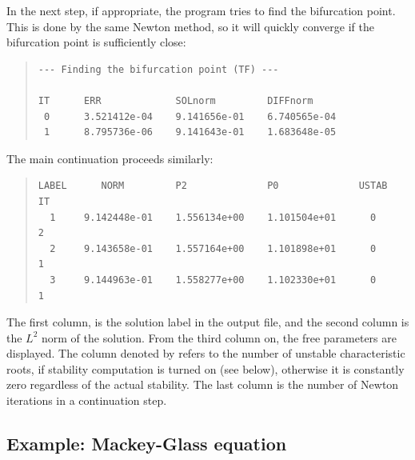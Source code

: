 \documentclass[10pt,a4paper]{ddedoc}
\begin{document}
In the next step, if appropriate, the program tries to find the bifurcation
point. This is done by the same Newton method, so it will quickly converge if
the bifurcation point is sufficiently close:
{ \small \begin{quote} \begin{lstlisting}[basicstyle=\tt,frame=single]
--- Finding the bifurcation point (TF) ---

IT      ERR             SOLnorm         DIFFnorm
 0      3.521412e-04    9.141656e-01    6.740565e-04
 1      8.795736e-06    9.141643e-01    1.683648e-05
\end{lstlisting} \end{quote} } \noindent

The main continuation proceeds similarly:
{ \small \begin{quote} \begin{lstlisting}[basicstyle=\tt,frame=single]
LABEL      NORM         P2              P0              USTAB   IT
  1     9.142448e-01    1.556134e+00    1.101504e+01      0     2
  2     9.143658e-01    1.557164e+00    1.101898e+01      0     1
  3     9.144963e-01    1.558277e+00    1.102330e+01      0     1
\end{lstlisting} \end{quote} } \noindent
The first column,  is the solution label in the output file, and
the second column is the $L^2$ norm of the solution. From the third column on,
the free parameters are displayed. The column denoted by  refers to
the number of unstable characteristic roots, if stability computation is turned
on (see  below), otherwise it is constantly zero regardless of the actual stability. 
The last column is the number of Newton iterations in a continuation step.

\subsection{Example: Mackey-Glass equation}
\end{document}

